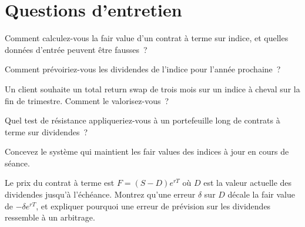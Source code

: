 \section{Questions d'entretien}

\begin{interviewq}\label{iq:s2:delta-one-and-dividends:1}
Comment calculez-vous la fair value d'un contrat à terme sur indice, et quelles données d'entrée peuvent être fausses~?
\end{interviewq}

\begin{interviewq}\label{iq:s2:delta-one-and-dividends:2}
Comment prévoiriez-vous les dividendes de l'indice pour l'année prochaine~?
\end{interviewq}

\begin{interviewq}\label{iq:s2:delta-one-and-dividends:3}
Un client souhaite un total return swap de trois mois sur un indice à cheval sur la fin de trimestre. Comment le valorisez-vous~?
\end{interviewq}

\begin{interviewq}\label{iq:s2:delta-one-and-dividends:4}
Quel test de résistance appliqueriez-vous à un portefeuille long de contrats à terme sur dividendes~?
\end{interviewq}

\begin{interviewq}\label{iq:s2:delta-one-and-dividends:5}
Concevez le système qui maintient les fair values des indices à jour en cours de séance.
\end{interviewq}

\begin{interviewq}\label{iq:s2:delta-one-and-dividends:6}
Le prix du contrat à terme est $F = (S - D) e^{rT}$ où $D$ est la valeur actuelle des dividendes jusqu'à l'échéance. Montrez qu'une erreur $\delta$ sur $D$ décale la fair value de
$-\delta e^{rT}$, et expliquer pourquoi une erreur de prévision sur les dividendes ressemble à un arbitrage.
\end{interviewq}

